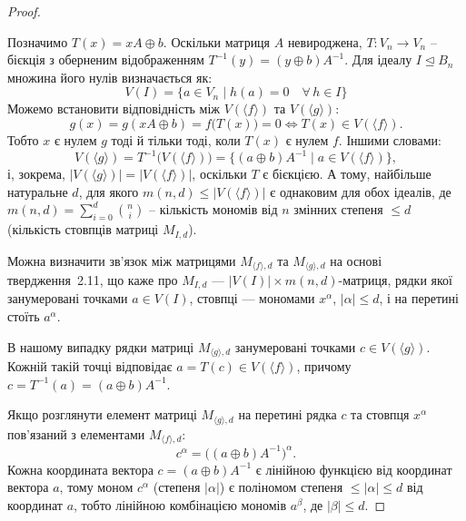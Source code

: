 \begin{proof}
    ~\par Позначимо $T(x) = xA \oplus b$. Оскільки матриця $A$ невироджена, $T : V_{n} \rightarrow V_{n}$ -- бієкція 
    з оберненим відображенням $T^{-1}(y) = (y \oplus b)A^{-1}$. Для ідеалу $I \trianglelefteq B_n$ множина його нулів 
    визначається як:
    \begin{equation*}
        V(I) = \{a \in V_n \mid h(a) = 0 \quad \forall\, h \in I\}
    \end{equation*}
    Можемо встановити відповідність між $V(\langle f \rangle)$ та $V(\langle g \rangle)$:
    \begin{equation*}
    g(x) = g(xA \oplus b) = f\big(T(x)\big) = 0 \Longleftrightarrow T(x) \in V(\langle f \rangle).
    \end{equation*}
    Тобто $x$ є нулем $g$ тоді й тільки тоді, коли $T(x)$ є нулем $f$. Іншими словами:
    \begin{equation*}
        V(\langle g \rangle) = T^{-1}\big(V(\langle f \rangle)\big)
        = \big\{(a \oplus b)A^{-1} \mid a \in V(\langle f \rangle)\big\},
    \end{equation*}
    і, зокрема, $|V(\langle g \rangle)| = |V(\langle f \rangle)|$, оскільки $T$ є бієкцією. А тому, найбільше 
    натуральне $d$, для якого $m(n,d) \leq |V(\langle f \rangle)|$ є однаковим для обох ідеалів, де 
    $m(n,d) = \sum\limits_{i=0}^{d} \binom{n}{i}$ -- кількість мономів від $n$ змінних степеня $\leq d$ (кількість 
    стовпців матриці $M_{I, d}$).

    Можна визначити зв'язок між матрицями $M_{\langle f \rangle, d}$ та $M_{\langle g \rangle, d}$ на основі 
    твердження~2.11, що каже про $M_{I,d}$ --- $|V(I)| \times m(n,d)$-матриця, рядки якої занумеровані точками 
    $a \in V(I)$, стовпці --- мономами $x^{\alpha}$, $|\alpha| \leq d$, і на перетині стоїть $a^{\alpha}$.

    В нашому випадку рядки матриці $M_{\langle g \rangle, d}$ занумеровані точками $c \in V(\langle g \rangle)$. 
    Кожній такій точці відповідає $a = T(c) \in V(\langle f \rangle)$, причому $c = T^{-1}(a) = (a \oplus b)A^{-1}$.

    Якщо розглянути елемент матриці $M_{\langle g \rangle, d}$ на перетині рядка $c$ та стовпця $x^{\alpha}$ пов'язаний 
    з елементами $M_{\langle f \rangle, d}$:
    \begin{equation*}
        c^{\alpha} = \big((a \oplus b)A^{-1}\big)^{\alpha}.
    \end{equation*}
    Кожна координата вектора $c = (a \oplus b)A^{-1}$ є лінійною функцією від координат вектора $a$, тому моном 
    $c^{\alpha}$ (степеня $|\alpha|$) є поліномом степеня $\leq |\alpha| \leq d$ від координат $a$, тобто лінійною 
    комбінацією мономів $a^{\beta}$, де $|\beta| \leq d$.


\end{proof}

